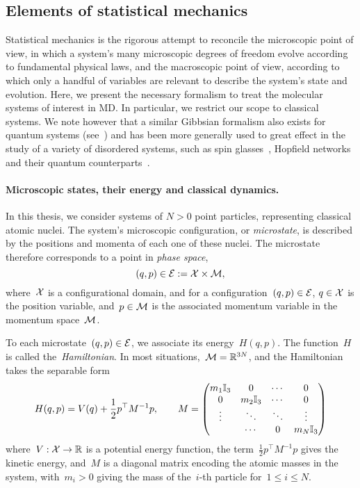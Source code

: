 \subsection{Elements of statistical mechanics}
Statistical mechanics is the rigorous attempt to reconcile the microscopic point of view, in which a system's many microscopic degrees of freedom evolve according to fundamental physical laws, and the macroscopic point of view, according to which only a handful of variables are relevant to describe the system's state and evolution.
Here, we present the necessary formalism to treat the molecular systems of interest in MD. In particular, we restrict our scope to classical systems.
We note however that a similar Gibbsian formalism also exists for quantum systems (see~\cite{F72}) and has been more generally used to great effect in the study of a variety of disordered systems, such as spin glasses~\cite{EA75}, Hopfield networks~\cite{P84} and their quantum counterparts~\cite{RY96,RMGLM18}.

\paragraph{Microscopic states, their energy and classical dynamics.}
In this thesis, we consider systems of $N>0$ point particles, representing classical atomic nuclei.
The system's microscopic configuration, or \textit{microstate}, is described by the positions and momenta of each one of these nuclei. The microstate therefore corresponds to a point in \textit{phase space}, 
\begin{equation}
    \label{eq:01:phase_space}
    (q,p)\in \mathcal{E} := \mathcal{X}\times \mathcal{M},
\end{equation}
where~$\mathcal{X}$ is a configurational domain, and for a configuration~$(q,p)\in\mathcal{E}$, $q\in\mathcal{X}$ is the position variable, and~$p\in \mathcal{M}$ is the associated momentum variable in the momentum space~$\mathcal{M}$.

To each microstate~$(q,p)\in\mathcal{E}$, we associate its energy~$H(q,p)$. The function~$H$ is called the~\textit{Hamiltonian}. In most situations,~$\mathcal{M}=\mathbb{R}^{3N}$, and the Hamiltonian takes the separable form
\begin{equation}
    \label{eq:01:hamiltonian}
    H(q,p) = V(q) + \frac12p^\top M^{-1}p,\qquad M = \begin{pmatrix}
    m_1 \mathbb{I}_3 & 0 & \dotsm & 0 \\
    0 & m_2 \mathbb{I}_3 & \dotsm & 0 \\
    \vdots & \ddots & \ddots & \vdots\\
    & \dotsm & 0 & m_N \mathbb{I}_3 
\end{pmatrix}
\end{equation}
where~$V:\mathcal{X}\to\mathbb{R}$ is a potential energy function, the term~$\frac12p^\top M^{-1}p$ gives the kinetic energy, and~$M$ is a diagonal matrix encoding the atomic masses in the system, with~$m_i>0$ giving the mass of the~$i$-th particle for~$1\leq i\leq N$.

